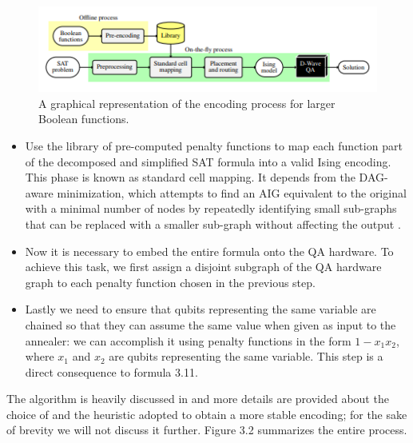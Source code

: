 \begin{figure}[t]
	\begin{center}
	\includegraphics[width=\textwidth]{images/LargeBool.PNG}
	\caption{A graphical representation of the encoding process for larger Boolean functions.}
	\end{center}
\end{figure}

\begin{itemize}
    \item Use the library of pre-computed penalty functions to map each function part of the decomposed and simplified SAT formula into a valid Ising encoding. This phase is known as standard cell mapping. It depends from the DAG-aware minimization, which attempts to find an AIG equivalent to the original with a minimal number of nodes by repeatedly identifying small
sub-graphs that can be replaced with a smaller sub-graph without affecting the output \cite{pa15}.
    \item Now it is necessary to embed the entire formula onto the QA hardware. To achieve this task, we first assign a disjoint subgraph of the QA hardware graph to each penalty function chosen in the previous step.
    \item Lastly we need to ensure that qubits representing the same variable are chained so that they can assume the same value when given as input to the annealer: we can accomplish it using penalty functions in the form $1 - x_1x_2$, where $x_1$ and $x_2$ are qubits representing the same variable. This step is a direct consequence to formula 3.11.
\end{itemize}

The algorithm is heavily discussed in \cite{varotti} and more details are provided about the choice of and the heuristic adopted to obtain a more stable encoding; for the sake of brevity we will not discuss it further. Figure 3.2 summarizes the entire process.

\newpage